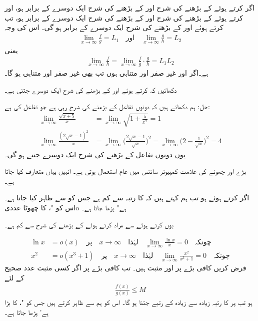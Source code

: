 اگر  کرتے ہوئے  کے بڑھنے کی شرح اور  کے بڑھنے کی شرح ایک دوسرے کے برابر ہو، اور  کرتے ہوئے  کے بڑھنے کی شرح اور  کے بڑھنے کی شرح ایک دوسرے کے برابر ہو، تب  کرتے ہوئے  اور  کے بڑھنے کی شرح ایک دوسرے کے برابر ہو گی۔ اس کی وجہ
\begin{align*}
\lim_{x\to \infty}\frac{f}{g}=L_1\quad \text{اور}\quad \lim_{x\to\infty}\frac{g}{h}=L_2
\end{align*}
یعنی
\begin{align*}
\lim_{x\to\infty}\frac{f}{h}=\lim_{x\to\infty}\frac{f}{g}\cdot\frac{g}{h}=L_1L_2
\end{align*}
ہے۔اگر  اور  غیر صفر اور متناہی ہوں تب  بھی غیر صفر اور متناہی ہو گا۔

دکھائیں کہ  کرتے ہوئے  اور  کے بڑھنے کی شرح ایک دوسرے جتنی ہے۔

حل:\quad
ہم دکھاتے ہیں کہ دونوں تفاعل کے بڑھنے کی شرح رہی ہے جو تفاعل  کی ہے:
\begin{align*}
\lim_{x\to\infty}\frac{\sqrt{x+5}}{x}&=\lim_{x\to\infty}\sqrt{1+\frac{5}{x^2}}=1\\
\lim_{x\to\infty}\frac{(2\sqrt{x}-1)^2}{x}&=\lim_{x\to \infty}\big(\frac{2\sqrt{x}-1}{\sqrt{x}}\big)^2=\lim_{x\to\infty}\big(2-\frac{1}{\sqrt{x}}\big)^2=4
\end{align*}
یوں دونوں تفاعل کے بڑھنے کی شرح ایک دوسرے جتنے ہو گی۔

بڑے  اور چھوٹے  کی علامت کمپیوٹر سائنس میں عام استعمال ہوتی ہے۔ انہیں یہاں متعارف کیا جاتا ہے۔

اگر  کرتے ہوئے  ہو تب  ہم کہتے ہیں کہ  کا رتبہ  سے کم ہے جس کو   سے ظاہر کیا جاتا ہے۔ اس کو "،  کا چھوٹا عددی{o} ہے" پڑھا جاتا ہے۔ 

یوں  کرتے ہوئے   سے مراد  کرتے ہوئے  کے بڑھنے کی شرح  سے کم ہے۔

\begin{align*}
\ln x&=o(x) \quad \text{پر}\quad x\to\infty\quad \text{لہٰذا}\quad \lim_{x\to\infty}\frac{\ln x}{x}=0\quad \text{چونکہ}\\
x^2&=o(x^3+1) \quad \text{پر}\quad x\to\infty\quad \text{لہٰذا}\quad \lim_{x\to\infty}\frac{x^2}{x^3+1}=0\quad \text{چونکہ}
\end{align*}
فرض کریں کافی بڑے  پر  اور  مثبت ہیں۔ تب کافی بڑے   پر اگر کسی مثبت عدد صحیح  کے لئے
\begin{align*}
\frac{f(x)}{g(x)}\le M
\end{align*}
ہو تب  پر  کا رتبہ زیادہ سے زیادہ  کے رتبے جتنا ہو گا۔ اس کو ہم  سے ظاہر کرتے ہیں جس
 کو "،  کا بڑا  ہے' پڑھا جاتا ہے۔

